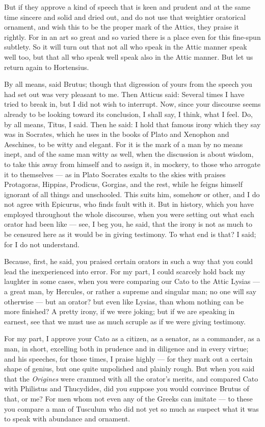  But if they approve a kind of speech that is keen and prudent and at the same time sincere and solid and dried out, and do not use that weightier oratorical ornament, and wish this to be the proper mark of the Attics, they praise it rightly. For in an art so great and so varied there is a place even for this fine-spun subtlety. So it will turn out that not all who speak in the Attic manner speak well too, but that all who speak well speak also in the Attic manner. But let us return again to Hortensius.

 By all means, said Brutus; though that digression of yours from the speech you had set out was very pleasant to me. Then Atticus said: Several times I have tried to break in, but I did not wish to interrupt. Now, since your discourse seems already to be looking toward its conclusion, I shall say, I think, what I feel. Do, by all means, Titus, I said. Then he said: I hold that famous irony which they say was in Socrates, which he uses in the books of Plato and Xenophon and Aeschines, to be witty and elegant. For it is the mark of a man by no means inept, and of the same man witty as well, when the discussion is about wisdom, to take this away from himself and to assign it, in mockery, to those who arrogate it to themselves — as in Plato Socrates exalts to the skies with praises Protagoras, Hippias, Prodicus, Gorgias, and the rest, while he feigns himself ignorant of all things and unschooled. This suits him, somehow or other, and I do not agree with Epicurus, who finds fault with it. But in history, which you have employed throughout the whole discourse, when you were setting out what each orator had been like — see, I beg you, he said, that the irony is not as much to be censured here as it would be in giving testimony. To what end is that? I said; for I do not understand.

 Because, first, he said, you praised certain orators in such a way that you could lead the inexperienced into error. For my part, I could scarcely hold back my laughter in some cases, when you were comparing our Cato to the Attic Lysias — a great man, by Hercules, or rather a supreme and singular man; no one will say otherwise — but an orator? but even like Lysias, than whom nothing can be more finished? A pretty irony, if we were joking; but if we are speaking in earnest, see that we must use as much scruple as if we were giving testimony.

 For my part, I approve your Cato as a citizen, as a senator, as a commander, as a man, in short, excelling both in prudence and in diligence and in every virtue; and his speeches, for those times, I praise highly — for they mark out a certain shape of genius, but one quite unpolished and plainly rough. But when you said that the \textit{Origines} were crammed with all the orator's merits, and compared Cato with Philistus and Thucydides, did you suppose you would convince Brutus of that, or me? For men whom not even any of the Greeks can imitate — to these you compare a man of Tusculum who did not yet so much as suspect what it was to speak with abundance and ornament.

